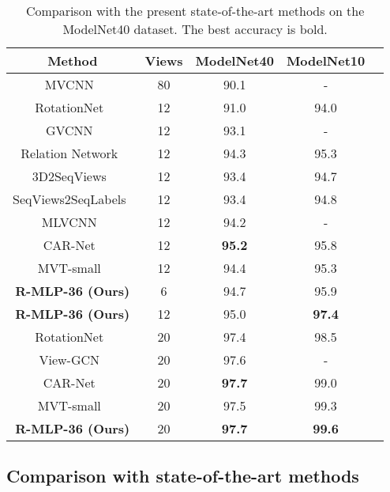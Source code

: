 \documentclass[11pt]{article}
\begin{document}
\begin{table*}[t!]
\caption{Comparison with the present state-of-the-art methods on the ModelNet40 dataset. The best accuracy is bold.}\label{tab:sota}
\centering
\begin{tabular}{ccccc}
\toprule
Method & Views & ModelNet40 & ModelNet10 \\
\midrule
MVCNN~\citep{su2015multi} & 80 & 90.1  & - \\
RotationNet~\citep{kanezaki2018rotationnet} & 12 & 91.0 & 94.0 \\
GVCNN~\citep{feng2018gvcnn} & 12 & 93.1 & - \\
Relation Network~\citep{yang2019learning} & 12 & 94.3 & 95.3 \\
3D2SeqViews~\citep{han20193d2seqvies} & 12 & 93.4 & 94.7 \\
SeqViews2SeqLabels~\citep{han2019seqview2seqlabels} & 12 & 93.4 & 94.8 \\
MLVCNN~\citep{jiang2019mlvcnn} & 12 & 94.2 & - \\
CAR-Net~\citep{xu2021multi} & 12 & \textbf{95.2} & 95.8 \\
MVT-small~\citep{chen2021mvt} & 12 & 94.4 & 95.3 \\
\rowcolor{mygray} {\textbf{R-MLP-36 (Ours)}} & 6 & 94.7 & 95.9 \\
\rowcolor{mygray} {\textbf{R-MLP-36 (Ours)}} & 12 & 95.0  & \textbf{97.4} \\
RotationNet~\citep{kanezaki2018rotationnet}& 20 & 97.4 & 98.5 \\
View-GCN~\citep{wei2020view} & 20 & 97.6 & - \\
CAR-Net~\citep{xu2021multi} & 20 & \textbf{97.7} & 99.0 \\
MVT-small~\citep{chen2021mvt} & 20 & 97.5 & 99.3 \\
\rowcolor{mygray} {\textbf{R-MLP-36 (Ours)}} & 20 & \textbf{97.7} & \textbf{99.6} \\
\bottomrule
\end{tabular}
\end{table*}

\newpage

\subsection{Comparison with state-of-the-art methods}
\end{document}
